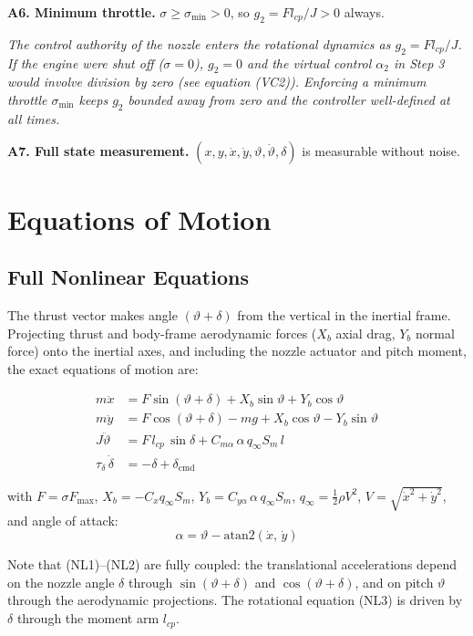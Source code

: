 \documentclass[11pt,a4paper]{article}
\theoremstyle{plain}
\theoremstyle{remark}
\newcommand{\vth}{\vartheta}
\newcommand{\dcmd}{\delta_{\mathrm{cmd}}}
\newcommand{\Fmax}{F_{\max}}
\begin{document}
\textbf{A6. Minimum throttle.} $\sigma \geq \sigma_{\min} > 0$, so $g_2 = F l_{cp}/J > 0$ always.

\textit{The control authority of the nozzle enters the rotational dynamics as $g_2 = F l_{cp}/J$. If the engine were shut off ($\sigma = 0$), $g_2 = 0$ and the virtual control $\alpha_2$ in Step 3 would involve division by zero (see equation (VC2)). Enforcing a minimum throttle $\sigma_{\min}$ keeps $g_2$ bounded away from zero and the controller well-defined at all times.}

\textbf{A7. Full state measurement.} $(x, y, \dot x, \dot y, \vth, \dot\vth, \delta)$ is measurable without noise.

\section{Equations of Motion}

\subsection{Full Nonlinear Equations}

The thrust vector makes angle $(\vth + \delta)$ from the vertical in the inertial frame. Projecting thrust and body-frame aerodynamic forces ($X_b$ axial drag, $Y_b$ normal force) onto the inertial axes, and including the nozzle actuator and pitch moment, the exact equations of motion are:

\begin{align}
  m\ddot x &= F\sin(\vth + \delta) + X_b\sin\vth + Y_b\cos\vth \tag{NL1} \\
  m\ddot y &= F\cos(\vth + \delta) - mg + X_b\cos\vth - Y_b\sin\vth \tag{NL2} \\
  J\ddot\vth &= F\,l_{cp}\,\sin\delta + C_{m\alpha}\,\alpha\,q_\infty S_m\,l \tag{NL3} \\
  \tau_\delta\,\dot\delta &= -\delta + \dcmd \tag{NL4}
\end{align}

with $F = \sigma \Fmax$, $X_b = -C_x q_\infty S_m$, $Y_b = C_{y\alpha}\,\alpha\,q_\infty S_m$, $q_\infty = \tfrac{1}{2}\rho V^2$, $V = \sqrt{\dot x^2 + \dot y^2}$, and angle of attack:
\[
  \alpha = \vth - \mathrm{atan2}(\dot x,\, \dot y)
\]

Note that (NL1)--(NL2) are fully coupled: the translational accelerations depend on the nozzle angle $\delta$ through $\sin(\vth+\delta)$ and $\cos(\vth+\delta)$, and on pitch $\vth$ through the aerodynamic projections. The rotational equation (NL3) is driven by $\delta$ through the moment arm $l_{cp}$.
\end{document}
